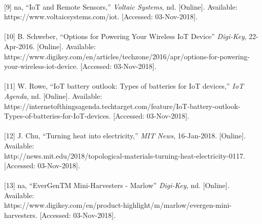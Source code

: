 \documentclass[10pt,draftclsnofoot,onecolumn,letterpaper]{article}
\begin{document}
\\{[}9] na, “IoT and Remote Sensors,” \textit{Voltaic Systems}, nd. [Online]. Available: https://www.voltaicsystems.com/iot. [Accessed: 03-Nov-2018].\\
\\{[}10] B. Schweber, “Options for Powering Your Wireless IoT Device” \textit{Digi-Key}, 22-Apr-2016. [Online]. Available: https://www.digikey.com/en/articles/techzone/2016/apr/options-for-powering-your-wireless-iot-device. [Accessed: 03-Nov-2018].\\
\\{[}11] W. Rowe, “IoT battery outlook: Types of batteries for IoT devices,” \textit{IoT Agenda}, nd. [Online]. Available: https://internetofthingsagenda.techtarget.com/feature/IoT-battery-outlook-Types-of-batteries-for-IoT-devices. [Accessed: 03-Nov-2018].\\
\\{[}12] J. Chu, “Turning heat into electricity,” \textit{MIT News}, 16-Jan-2018. [Online]. Available:\\ http://news.mit.edu/2018/topological-materials-turning-heat-electricity-0117. [Accessed: 03-Nov-2018].\\
\\{[}13] na, “EverGenTM Mini-Harvesters - Marlow” \textit{Digi-Key}, nd. [Online]. Available:\\ https://www.digikey.com/en/product-highlight/m/marlow/evergen-mini-harvesters. [Accessed: 03-Nov-2018].
\end{document}
